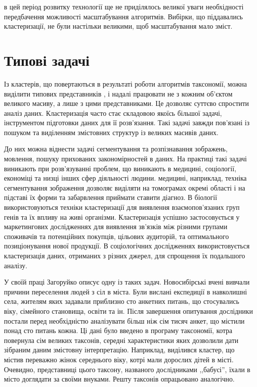     в цей період розвитку технології ще не приділялось великої уваги необхідності передбачення можливості масштабування алгоритмів. Вибірки, що піддавались кластеризації, не були настільки великими, щоб масштабування мало зміст.

\section{Типові задачі}
    Із кластерів, що повертаються в результаті роботи алгоритмів таксономії, можна виділити типових представників , і надалі працювати не з кожним об'єктом великого масиву, а лише з цими представниками. Це дозволяє суттєво спростити аналіз даних. Кластеризація часто стає складовою якоїсь більшої задачі, інструментом підготовки даних для її розв'язання. Такі задачі завжди пов'язані із пошуком та виділенням змістовних структур із великих масивів даних. 

    До них можна віднести задачі сегментування та розпізнавання зображень, мовлення, пошуку прихованих закономірностей в даних. На практиці такі задачі виникають при розв'язуванні проблем, що виникають в медицині, соціології, економіці та низці інших сфер діяльності людини. 
     медицині, наприклад, техніка сегментування зображення дозволяє виділяти на томограмах окремі області і на підставі їх форми та забарвлення приймати ставити діагноз. 
    В біології використовуються техніки кластеризації для виявлення взаємопов'язаних груп генів та їх впливу на живі організми. 
    Кластеризація успішно застосовується у маркетингових дослідженнях для виявлення зв'язків між різними групами споживачів та потенційних покупців, цільових аудиторій, та оптимального позиціонування нової продукції. 
    В соціологічних дослідженнях використовується кластеризація даних, отриманих з різних джерел, для спрощення їх подальшого аналізу. 

    У своїй праці \cite{Zagorujko} Загоруйко описує одну із таких задач. Новосибірські вчені вивчали причини переселення людей з сіл в міста. Були вислані експедиції в навколишні села, жителям яких задавали приблизно сто анкетних питань, що стосувались віку, сімейного становища, освіти та ін. Після завершення опитування дослідники постали перед необхідністю аналізувати більш ніж сім тисяч анкет, що містили понад сто питань кожна. 
    Ці дані було введено в програму таксономії, котра повернула сім великих таксонів, середні характеристики яких дозволили дати зібраним даним змістовну інтерпретацію. Наприклад, виділився кластер, що містив переважно жінок середнього віку, котрі мали дорослих дітей в місті. Очевидно, представниці цього таксону, названого дослідниками ,,бабусі'', їхали в місто доглядати за своїми внуками. Решту таксонів опрацьовано аналогічно.
    
